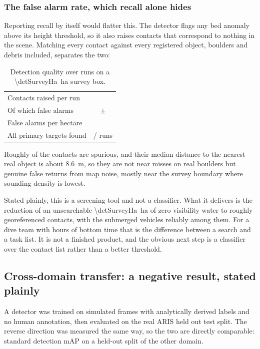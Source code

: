 \documentclass[10pt,a4paper]{article}
\begin{document}
\subsubsection{The false alarm rate, which recall alone hides}

Reporting recall by itself would flatter this. The detector flags any bed
anomaly above its height threshold, so it also raises contacts that correspond
to nothing in the scene. Matching every contact against every registered
object, boulders and debris included, separates the two:

\begin{table}[htbp]\centering\small
\caption{Detection quality over \detRuns{} runs on a
\SI{\detSurveyHa}{\hectare} survey box.}
\begin{tabular}{lc}
\toprule
Contacts raised per run & \detContacts{} \\
Of which false alarms & \detFalseAlarms{} $\pm$ \detFalseAlarmsSd{} \\
False alarms per hectare & \detFalsePerHa{} \\
All primary targets found & \detAllFound{}/\detRuns{} runs \\
\bottomrule
\end{tabular}
\end{table}

Roughly \detFalseAlarms{} of the \detContacts{} contacts are spurious, and
their median distance to the nearest real object is about \SI{8.6}{\metre}, so
they are not near misses on real boulders but genuine false returns from map
noise, mostly near the survey boundary where sounding density is lowest.

Stated plainly, this is a screening tool and not a classifier. What it delivers
is the reduction of an unsearchable \SI{\detSurveyHa}{\hectare} of zero
visibility water to roughly \detContacts{} georeferenced contacts, with the
submerged vehicles reliably among them. For a dive team with hours of bottom
time that is the difference between a search and a task list. It is not a
finished product, and the obvious next step is a classifier over the contact
list rather than a better threshold.

\subsection{Cross-domain transfer: a negative result, stated plainly}

A detector was trained on \synthTrain{} simulated frames with analytically
derived labels and no human annotation, then evaluated on the real ARIS held
out test split. The reverse direction was measured the same way, so the two
are directly comparable: standard detection mAP on a held-out split of the
other domain.
\end{document}
